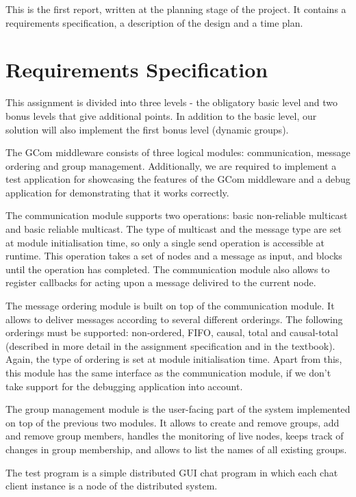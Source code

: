 \documentclass[10pt, oneside]{article}
\begin{document}
This is the first report, written at the planning stage of the project. It
contains a requirements specification, a description of the design and a time
plan.

\section{Requirements Specification}

This assignment is divided into three levels - the obligatory basic level and
two bonus levels that give additional points. In addition to the basic level,
our solution will also implement the first bonus level (dynamic groups).

The GCom middleware consists of three logical modules: communication, message
ordering and group management. Additionally, we are required to implement a test
application for showcasing the features of the GCom middleware and a debug
application for demonstrating that it works correctly.

The communication module supports two operations: basic non-reliable multicast
and basic reliable multicast. The type of multicast and the message type are set
at module initialisation time, so only a single send operation is accessible at
runtime. This operation takes a set of nodes and a message as input, and blocks
until the operation has completed. The communication module also allows to
register callbacks for acting upon a message delivired to the current node.

The message ordering module is built on top of the communication module. It
allows to deliver messages according to several different orderings. The
following orderings must be supported: non-ordered, FIFO, causal, total and
causal-total (described in more detail in the assignment specification and in
the textbook\cite{Textbook}). Again, the type of ordering is set at module
initialisation time. Apart from this, this module has the same interface as the
communication module, if we don't take support for the debugging application
into account.

The group management module is the user-facing part of the system implemented on
top of the previous two modules. It allows to create and remove groups, add and
remove group members, handles the monitoring of live nodes, keeps track of
changes in group membership, and allows to list the names of all existing
groups.

The test program is a simple distributed GUI chat program in which each chat
client instance is a node of the distributed system.
\end{document}
